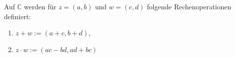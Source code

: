 Auf $\mathbb{C}$ werden für $z = (a, b)$ und $w = (c, d)$ folgende Rechenoperationen definiert:
\begin{enumerate}[label={},leftmargin=*]
    \item {} $z+w := (a+c, b+d)$,
    \item {} $z \cdot w := (ac - bd, ad+bc)$
\end{enumerate}